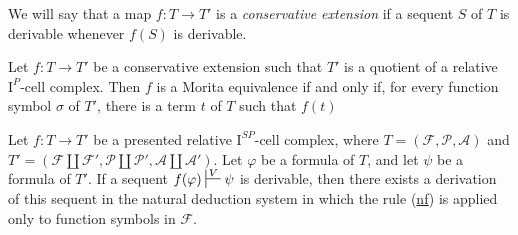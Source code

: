 \documentclass[reqno]{amsart}
\newcommand{\axref}[1]{(\hyperref[ax:#1]{#1})}
\theoremstyle{definition}
\theoremstyle{remark}
\newcommand{\I}{\mathrm{I}}
\numberwithin{figure}{section}
\begin{document}
We will say that a map $f : T \to T'$ is a \emph{conservative extension} if a sequent $S$ of $T$ is derivable whenever $f(S)$ is derivable.

\begin{prop}
Let $f : T \to T'$ be a conservative extension such that $T'$ is a quotient of a relative $\I^P$-cell complex.
Then $f$ is a Morita equivalence if and only if, for every function symbol $\sigma$ of $T'$, there is a term $t$ of $T$ such that $f(t)$
\end{prop}

\begin{lem}
Let $f : T \to T'$ be a presented relative $\I^{SP}$-cell complex, where $T = (\mathcal{F},\mathcal{P},\mathcal{A})$ and $T' = (\mathcal{F} \amalg \mathcal{F}', \mathcal{P} \amalg \mathcal{P}', \mathcal{A} \amalg \mathcal{A}')$.
Let $\varphi$ be a formula of $T$, and let $\psi$ be a formula of $T'$.
If a sequent $f(\varphi) \sststile{}{V} \psi$ is derivable, then there exists a derivation of this sequent in the natural deduction system
in which the rule \axref{nf} is applied only to function symbols in $\mathcal{F}$.
\end{lem}
\end{document}
